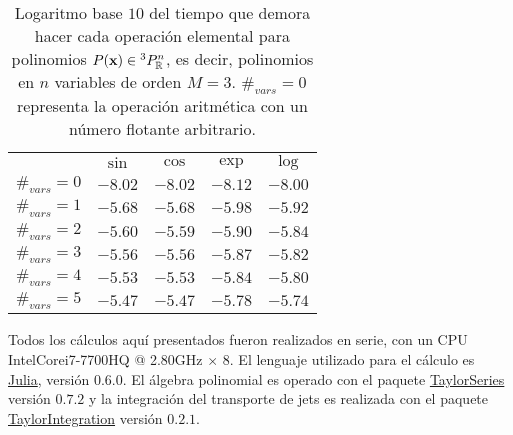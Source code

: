 \begin{table}[h!]
\centering
\begin{tabular}{c|cccc}
\toprule
     & \textbf{$\sin$} & \textbf{$\cos$} & \textbf{$\exp$} & \textbf{$\log$} \\ \cmidrule(l){1-5} 
 $\#_{vars} = 0$ & $-8.02$ & $-8.02$ & $-8.12$ & $-8.00$ \\
 $\#_{vars} = 1$ & $-5.68$ & $-5.68$ & $-5.98$ & $-5.92$ \\
 $\#_{vars} = 2$ & $-5.60$ & $-5.59$ & $-5.90$ & $-5.84$ \\
 $\#_{vars} = 3$ & $-5.56$ & $-5.56$ & $-5.87$ & $-5.82$ \\
 $\#_{vars} = 4$ & $-5.53$ & $-5.53$ & $-5.84$ & $-5.80$ \\
 $\#_{vars} = 5$ & $-5.47$ & $-5.47$ & $-5.78$ & $-5.74$ \\ \bottomrule 
\end{tabular}
\caption{Logaritmo base $10$ del tiempo que demora hacer cada operación elemental para polinomios $P(\mathbf{x}) \in {^{3}P_{\mathbb{R}}^ n }$, es decir, polinomios en $n$ variables de orden $M = 3$. $\#_{vars}=0$ representa la operación aritmética con un número flotante arbitrario.}
\label{table:times_algpoli_2}
\end{table}

Todos los cálculos aquí presentados fueron realizados en serie, con un CPU Intel\textregistered  Core\texttrademark  i7-7700HQ @ 2.80GHz $\times$ 8. El lenguaje utilizado para el cálculo es \href{julialang.org}{\textsf{Julia}}, versión $0.6.0$. El álgebra polinomial es operado con el paquete \href{https://github.com/JuliaDiff/TaylorSeries.jl}{\textsf{TaylorSeries}} versión $0.7.2$ y la integración del transporte de jets es realizada con el paquete \href{https://github.com/PerezHz/TaylorIntegration.jl}{\textsf{TaylorIntegration}} versión $0.2.1$.